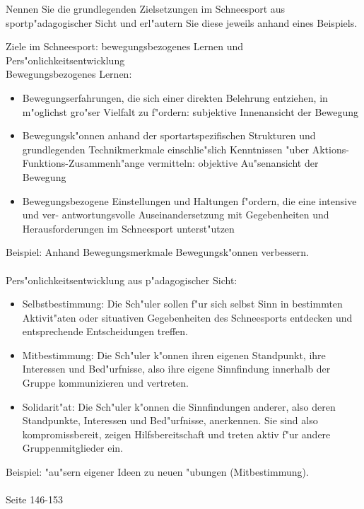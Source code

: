 \begin{question}{5}
Nennen Sie die grundlegenden Zielsetzungen im Schneesport aus sportp"adagogischer Sicht und erl"autern Sie diese jeweils anhand eines Beispiels. 
\end{question}
\begin{solution}
Ziele im Schneesport: bewegungsbezogenes Lernen und Pers"onlichkeitsentwicklung\\
Bewegungsbezogenes Lernen:
\begin{itemize}
\item Bewegungserfahrungen, die sich einer direkten Belehrung entziehen, in m"oglichst gro"ser Vielfalt zu f"ordern: subjektive Innenansicht der Bewegung
\item Bewegungsk"onnen anhand der sportartspezifischen Strukturen und grundlegenden Technikmerkmale einschlie"slich Kenntnissen "uber Aktions-Funktions-Zusammenh"ange vermitteln: objektive Au"senansicht der Bewegung
\item Bewegungsbezogene Einstellungen und Haltungen f"ordern, die eine intensive und ver- antwortungsvolle Auseinandersetzung mit Gegebenheiten und Herausforderungen im Schneesport unterst"utzen
\end{itemize}
Beispiel: Anhand Bewegungsmerkmale Bewegungsk"onnen verbessern.\\\\
Pers"onlichkeitsentwicklung aus p"adagogischer Sicht:
\begin{itemize}
\item Selbstbestimmung: Die Sch"uler sollen f"ur sich selbst Sinn in bestimmten Aktivit"aten oder situativen Gegebenheiten des Schneesports entdecken und entsprechende Entscheidungen treffen.
\item Mitbestimmung: Die Sch"uler k"onnen ihren eigenen Standpunkt, ihre Interessen und Bed"urfnisse, also ihre eigene Sinnfindung innerhalb der Gruppe kommunizieren und
vertreten.
\item Solidarit"at: Die Sch"uler k"onnen die Sinnfindungen anderer, also deren Standpunkte,
Interessen und Bed"urfnisse, anerkennen. Sie sind also kompromissbereit, zeigen Hilfsbereitschaft und treten aktiv f"ur andere Gruppenmitglieder ein.
\end{itemize}
Beispiel: "au"sern eigener Ideen zu neuen "ubungen (Mitbestimmung).\\\\
 Seite 146-153
\end{solution}

